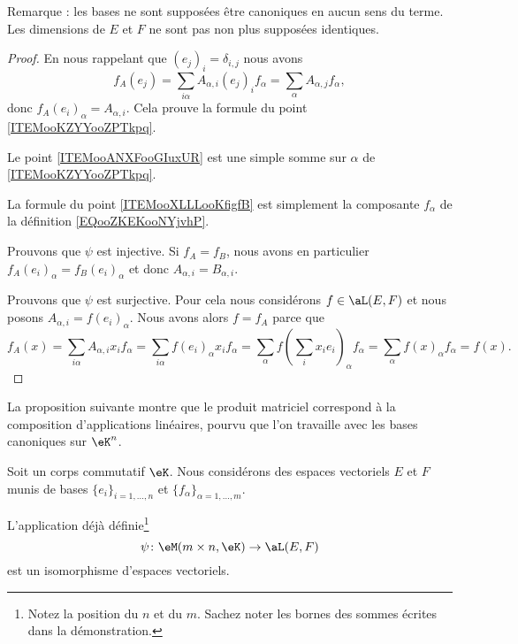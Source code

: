 Remarque : les bases ne sont supposées être canoniques en aucun sens du terme. Les dimensions de \( E\) et \( F\) ne sont pas non plus supposées identiques.

\begin{proof}
	En nous rappelant que \( (e_j)_i=\delta_{i,j}\) nous avons
	\begin{equation}        \label{EQooWGZHooIBoygB}
		f_A(e_j)=\sum_{i\alpha}A_{\alpha, i}(e_j)_if_{\alpha}=\sum_{\alpha}A_{\alpha, j}f_{\alpha},
	\end{equation}
	donc \( f_A(e_i)_{\alpha}=A_{\alpha, i}\). Cela prouve la formule du point \ref{ITEMooKZYYooZPTkpq}.

	Le point \ref{ITEMooANXFooGIuxUR} est une simple somme sur \( \alpha\) de \ref{ITEMooKZYYooZPTkpq}.

	La formule du point \ref{ITEMooXLLLooKfigfB} est simplement la composante \( f_{\alpha}\) de la définition \ref{EQooZKEKooNYjvhP}.

	Prouvons que \( \psi\) est injective. Si \( f_A=f_B\), nous avons en particulier \( f_A(e_i)_{\alpha}=f_B(e_i)_{\alpha}\) et donc \( A_{\alpha, i}=B_{\alpha, i}\).

	Prouvons que \( \psi\) est surjective. Pour cela nous considérons \( f\in \aL(E,F)\) et nous posons \( A_{\alpha, i}=f(e_i)_{\alpha}\). Nous avons alors \( f=f_A\) parce que
	\begin{equation}
		f_A(x)=\sum_{i\alpha}A_{\alpha, i}x_if_{\alpha}=\sum_{i\alpha}f(e_i)_{\alpha}x_if_{\alpha}=\sum_{\alpha}f(\sum_ix_ie_i)_{\alpha}f_{\alpha}=\sum_{\alpha}f(x)_{\alpha}f_{\alpha}=f(x).
	\end{equation}
\end{proof}

La proposition suivante montre que le produit matriciel correspond à la composition d'applications linéaires, pourvu que l'on travaille avec les bases canoniques sur \( \eK^n\).
\begin{proposition}      \label{PROPooIYVQooOiuRhX}
	Soit un corps commutatif \( \eK\). Nous considérons des espaces vectoriels \( E\) et \( F\) munis de bases \( \{ e_i \}_{i=1,\ldots, n}\) et \( \{ f_{\alpha}\}_{\alpha=1,\ldots, m} \).

	L'application déjà définie\footnote{Notez la position du \( n\) et du \( m\). Sachez noter les bornes des sommes écrites dans la démonstration.}
	\begin{equation}
		\psi\colon \eM(m\times n,\eK)\to \aL(E,F)
	\end{equation}
	est un isomorphisme d'espaces vectoriels.
\end{proposition}


